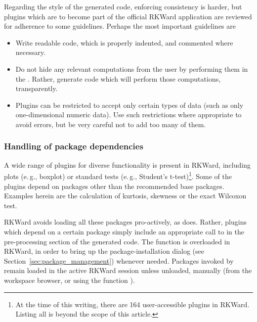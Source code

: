 Regarding the style of the generated  code, enforcing consistency is harder,
but plugins which are to become part of the official RKWard application are
reviewed for adherence to some guidelines. Perhaps the most important guidelines
are 

\begin{itemize}
  \item 
  Write readable code, which is properly indented, and commented where necessary.

  \item 
  Do not hide any relevant computations from the user by performing them in the
  . Rather, generate  code which will perform
  those computations, transparently.

  \item
  Plugins can be restricted to accept only certain types of data (such as only one-dimensional numeric data).
  Use such restrictions where appropriate to avoid errors, but be very careful not to add
  too many of them.
\end{itemize}

\subsubsection[Handling of R package dependencies]{Handling of  package dependencies}
\label{sec:technical_plugins_dependencies}
A wide range of plugins for diverse functionality is present in RKWard,
including plots (e.\,g., boxplot) or standard tests (e.\,g., Student's t-test)\footnote{
  At the time of this writing, there are 164 user-accessible plugins in RKWard.
  Listing all is beyond the scope of this article.
}. Some
of the plugins depend on  packages other than the recommended  base packages.
Examples herein are the calculation of kurtosis, skewness or the exact Wilcoxon
test.

RKWard avoids loading all these packages pro-actively, as  does. Rather,
plugins which depend on a certain package simply include an appropriate call to
 in the pre-processing section of the generated  code. The 
function is overloaded in RKWard, in order to bring up the package-installation
dialog (see Section~\ref{sec:package_management}) whenever needed. Packages invoked by  remain loaded
in the active RKWard session unless unloaded, manually (from the workspace browser, or using the
 function ).

